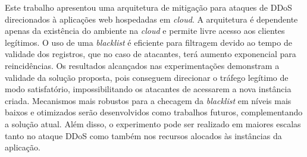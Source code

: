 
Este trabalho apresentou uma arquitetura de mitigação para ataques de DDoS direcionados à aplicações web hospedadas em \emph{cloud}. A arquitetura é dependente apenas da existência do ambiente na \emph{cloud} e permite livre acesso aos clientes legítimos. O uso de uma \emph{blacklist} é eficiente para filtragem devido ao tempo de validade dos registros, que no caso de atacantes, terá aumento exponencial para reincidências. 
%
Os resultados alcançados nas experimentações demonstram a validade da solução proposta, pois conseguem direcionar o tráfego legítimo de modo satisfatório, impossibilitando os atacantes de acessarem a nova instância criada. Mecanismos mais robustos para a checagem da \emph{blacklist} em níveis mais baixos e otimizados serão desenvolvidos como trabalhos futuros, complementando a solução atual. Além disso, o experimento pode ser realizado em maiores escalas tanto no ataque DDoS como também nos recursos alocados às instâncias da aplicação.

